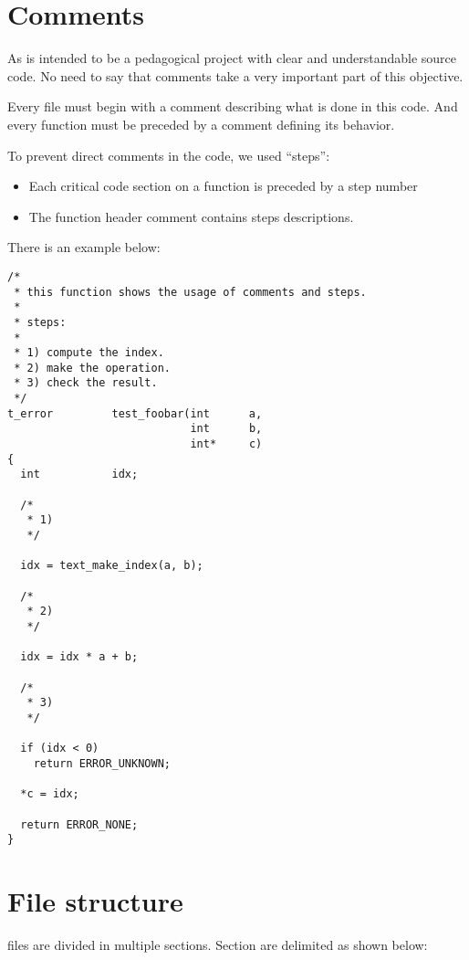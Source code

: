 \section*{Comments}

As \kaneton  is intended  to be a  pedagogical project with  clear and
understandable source code.  No need to say that  comments take a very
important part of this objective.

Every file must  begin with a comment describing what  is done in this
code. And  every function must be  preceded by a  comment defining its
behavior.

To prevent direct comments in the code, we used ``steps'':

\begin{itemize}

\item Each critical  code section on a function is  preceded by a step
number

\item The function header comment contains steps descriptions.

\end{itemize}

There is an example below:

\begin{verbatim}
/*
 * this function shows the usage of comments and steps.
 *
 * steps:
 *
 * 1) compute the index.
 * 2) make the operation.
 * 3) check the result.
 */
t_error         test_foobar(int      a,
                            int      b,
                            int*     c)
{
  int           idx;

  /*
   * 1)
   */

  idx = text_make_index(a, b);

  /*
   * 2)
   */

  idx = idx * a + b;

  /*
   * 3)
   */

  if (idx < 0)
    return ERROR_UNKNOWN;

  *c = idx;

  return ERROR_NONE;
}
\end{verbatim}

\section*{File structure}

\kaneton files are divided in multiple sections. Section are delimited
as shown below:

